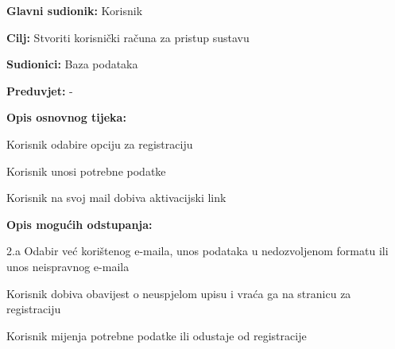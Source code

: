 \documentclass[11pt]{book}
\begin{document}
\noindent {}
					\begin{packed_item}
	
						\item \textbf{Glavni sudionik: }Korisnik
						\item \textbf{Cilj:} Stvoriti korisnički računa za pristup sustavu
						\item \textbf{Sudionici:} Baza podataka
						\item \textbf{Preduvjet:} -
						\item \textbf{Opis osnovnog tijeka:}
						
						\item[] \begin{packed_enum}
	
							\item Korisnik odabire opciju za registraciju
							\item Korisnik unosi potrebne podatke
							\item Korisnik na svoj mail dobiva aktivacijski link
							
						\end{packed_enum}
						
						\item  \textbf{Opis mogućih odstupanja:}
						
						\item[] \begin{packed_item}
	
							\item[2.a] Odabir već korištenog e-maila, unos podataka u nedozvoljenom formatu ili unos neispravnog e-maila
							\item[] \begin{packed_enum}
								
								\item Korisnik dobiva obavijest o neuspjelom upisu i vraća ga na stranicu za registraciju
								\item Korisnik mijenja potrebne podatke ili odustaje od registracije
								
							\end{packed_enum}
							
							
						\end{packed_item}
					\end{packed_item}
\end{document}
